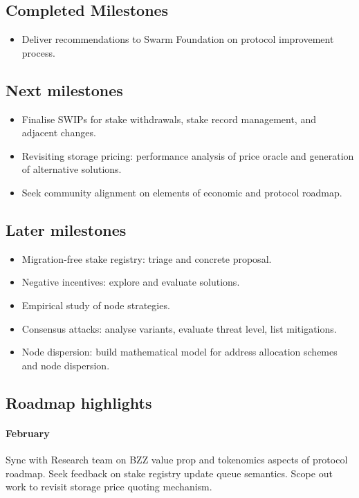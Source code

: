 \subsection*{Completed Milestones}

\begin{itemize}
  \item Deliver recommendations to Swarm Foundation on protocol improvement process.
\end{itemize}

\subsection*{Next milestones}

\begin{itemize}
  \item Finalise SWIPs for stake withdrawals, stake record management, and adjacent changes.
  \item Revisiting storage pricing: performance analysis of price oracle and generation of alternative solutions.
  \item Seek community alignment on elements of economic and protocol roadmap.
\end{itemize}

\subsection*{Later milestones}
\begin{itemize}
  \item Migration-free stake registry: triage and concrete proposal.
  \item Negative incentives: explore and evaluate solutions.
  \item Empirical study of node strategies.
  \item Consensus attacks: analyse variants, evaluate threat level, list mitigations.
  \item Node dispersion: build mathematical model for address allocation schemes and node dispersion.
\end{itemize}


\subsection*{Roadmap highlights}

\paragraph{February}
%
Sync with Research team on BZZ value prop and tokenomics aspects of protocol roadmap.
%
Seek feedback on stake registry update queue semantics.
%
Scope out work to revisit storage price quoting mechanism.

